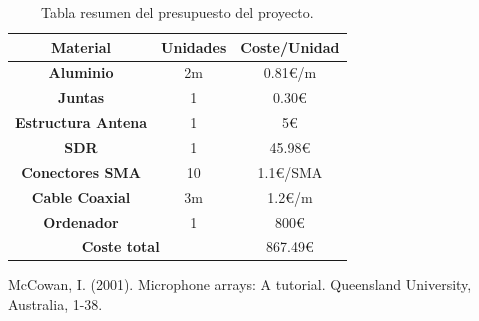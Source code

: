 \documentclass[a4paper,openright,12pt]{article}
\begin{document}
\begin{table}[h!]
\centering
\begin{tabular}{|c|c|c|} 
\hline
\textbf{Material}          & \textbf{Unidades} & \textbf{Coste/Unidad}            \\ 
\hline
\textbf{Aluminio}          & 2m                & 0.81\euro{}/m   \\ 
\hline
\textbf{Juntas}            & 1                 & 0.30\euro{}     \\ 
\hline
\textbf{Estructura Antena} & 1                 & 5\euro{}        \\ 
\hline
\textbf{SDR}               & 1                 & 45.98\euro{}    \\ 
\hline
\textbf{Conectores SMA}    & 10                & 1.1\euro{}/SMA  \\ 
\hline
\textbf{Cable Coaxial}     & 3m                & 1.2\euro{}/m    \\ 
\hline
\textbf{Ordenador}               & 1                 & 800\euro{}    \\ 
\hline
\multicolumn{2}{|c|}{\textbf{Coste total}}              & 867.49\euro{}    \\
\hline

\end{tabular}
\caption{Tabla resumen del presupuesto del proyecto.}
\label{Tab3:Presupuesto}
\end{table}

\begin{thebibliography}{1}


McCowan, I. (2001). Microphone arrays: A tutorial. Queensland University, Australia, 1-38.


\end{thebibliography}
\end{document}
